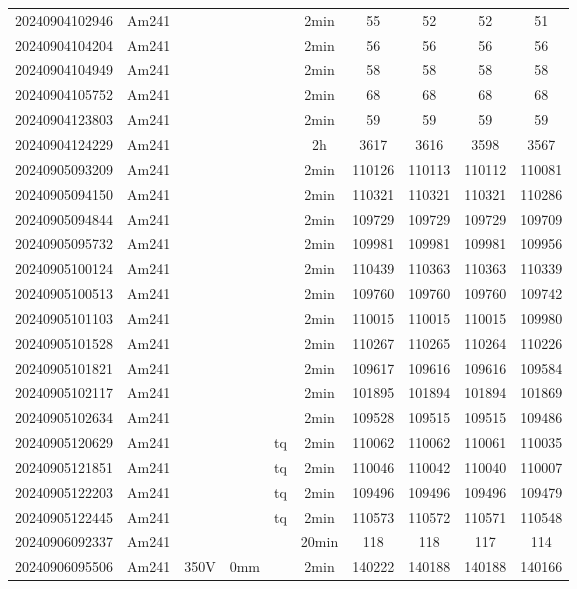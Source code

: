 \begin{center}
{\begin{longtable}{c c c c c c c c c c}
    20240904102946 & Am241 &  &  &  & 2min & 55 & 52 & 52 & 51 \\
    20240904104204 & Am241 &  &  &  & 2min & 56 & 56 & 56 & 56 \\
    20240904104949 & Am241 &  &  &  & 2min & 58 & 58 & 58 & 58 \\
    20240904105752 & Am241 &  &  &  & 2min & 68 & 68 & 68 & 68 \\
    20240904123803 & Am241 &  &  &  & 2min & 59 & 59 & 59 & 59 \\
    20240904124229 & Am241 &  &  &  & 2h & 3617 & 3616 & 3598 & 3567 \\
    20240905093209 & Am241 &  &  &  & 2min & 110126 & 110113 & 110112 & 110081 \\
    20240905094150 & Am241 &  &  &  & 2min & 110321 & 110321 & 110321 & 110286 \\
    20240905094844 & Am241 &  &  &  & 2min & 109729 & 109729 & 109729 & 109709 \\
    20240905095732 & Am241 &  &  &  & 2min & 109981 & 109981 & 109981 & 109956 \\
    20240905100124 & Am241 &  &  &  & 2min & 110439 & 110363 & 110363 & 110339 \\
    20240905100513 & Am241 &  &  &  & 2min & 109760 & 109760 & 109760 & 109742 \\
    20240905101103 & Am241 &  &  &  & 2min & 110015 & 110015 & 110015 & 109980 \\
    20240905101528 & Am241 &  &  &  & 2min & 110267 & 110265 & 110264 & 110226 \\
    20240905101821 & Am241 &  &  &  & 2min & 109617 & 109616 & 109616 & 109584 \\
    20240905102117 & Am241 &  &  &  & 2min & 101895 & 101894 & 101894 & 101869 \\
    20240905102634 & Am241 &  &  &  & 2min & 109528 & 109515 & 109515 & 109486 \\
    20240905120629 & Am241 &  &  & tq & 2min & 110062 & 110062 & 110061 & 110035 \\
    20240905121851 & Am241 &  &  & tq & 2min & 110046 & 110042 & 110040 & 110007 \\
    20240905122203 & Am241 &  &  & tq & 2min & 109496 & 109496 & 109496 & 109479 \\
    20240905122445 & Am241 &  &  & tq & 2min & 110573 & 110572 & 110571 & 110548 \\
    20240906092337 & Am241 &  &  &  & 20min & 118 & 118 & 117 & 114 \\
    20240906095506 & Am241 & 350V & 0mm &  & 2min & 140222 & 140188 & 140188 & 140166 \\

\end{longtable}}
\end{center}

